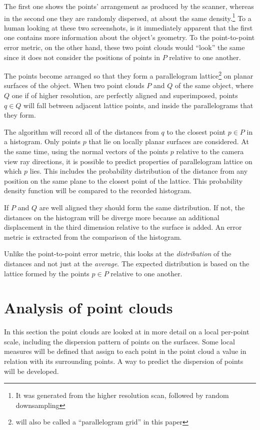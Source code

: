 The first one shows the points' arrangement as produced by the scanner, whereas in the second one they are randomly dispersed, at about the same density.\footnote{It was generated from the higher resolution scan, followed by random downsampling} To a human looking at these two screenshots, is it immediately apparent that the first one contains more information about the object's geometry. To the point-to-point error metric, on the other hand, these two point clouds would ``look'' the same since it does not consider the positions of points in $P$ relative to one another.

The points become arranged so that they form a parallelogram lattice\footnote{will also be called a ``parallelogram grid'' in this paper} on planar surfaces of the object. When two point clouds $P$ and $Q$ of the same object, where $Q$ one if of higher resolution, are perfectly aligned and superimposed, points $q \in Q$ will fall between adjacent lattice points, and inside the parallelograms that they form.

The algorithm will record all of the distances from $q$ to the closest point $p \in P$ in a histogram. Only points $p$ that lie on locally planar surfaces are considered. At the same time, using the normal vectors of the points $p$ relative to the camera view ray directions, it is possible to predict properties of parallelogram lattice on which $p$ lies. This includes the probability distribution of the distance from any position on the same plane to the closest point of the lattice. This probability density function will be compared to the recorded histogram.

If $P$ and $Q$ are well aligned they should form the same distribution. If not, the distances on the histogram will be diverge more because an additional displacement in the third dimension relative to the surface is added. An error metric is extracted from the comparison of the histogram.

Unlike the point-to-point error metric, this looks at the \emph{distribution} of the distances and not just at the \emph{average}. The expected distribution is based on the lattice formed by the points $p \in P$ relative to one another.



\newpage

\section{Analysis of point clouds}
In this section the point clouds are looked at in more detail on a local per-point scale, including the dispersion pattern of points on the surfaces. Some local measures will be defined that assign to each point in the point cloud a value in relation with its surrounding points. A way to predict the dispersion of points will be developed.


